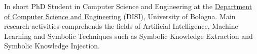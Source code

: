 \documentclass{resume} %
\begin{document}
    
    \begin{rSection}{In short}
        PhD Student in Computer Science and Engineering at the \href{https://disi.unibo.it/it}{Department of Computer Science and Engineering} (DISI), University of Bologna.
        Main research activities comprehends the fields of Artificial Intelligence, Machine Learning and Symbolic Techniques such as Symbolic Knowledge Extraction and Symbolic Knowledge Injection.
        
    \end{rSection}
    
    
\end{document}
